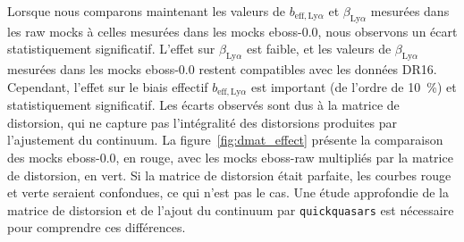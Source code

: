 Lorsque nous comparons maintenant les valeurs de $b_{\mathrm{eff},\mathrm{Ly}\alpha}$ et $\beta_{\mathrm{Ly}\alpha}$ mesurées dans les raw mocks à celles mesurées dans les mocks eboss-0.0, nous observons un écart statistiquement significatif.
L'effet sur $\beta_{\mathrm{Ly}\alpha}$ est faible, et les valeurs de $\beta_{\mathrm{Ly}\alpha}$ mesurées dans les mocks eboss-0.0 restent compatibles avec les données DR16.
Cependant, l'effet sur le biais effectif $b_{\mathrm{eff},\mathrm{Ly}\alpha}$ est important (de l'ordre de \SI{10}{\percent}) et statistiquement significatif.
Les écarts observés sont dus à la matrice de distorsion, qui ne capture pas l'intégralité des distorsions produites par l'ajustement du continuum.
La figure~\ref{fig:dmat_effect} présente la comparaison des mocks eboss-0.0, en rouge, avec les mocks eboss-raw multipliés par la matrice de distorsion, en vert. Si la matrice de distorsion était parfaite, les courbes rouge et verte seraient confondues, ce qui n'est pas le cas. Une étude approfondie de la matrice de distorsion et de l'ajout du continuum par \texttt{quickquasars} est nécessaire pour comprendre ces différences.
